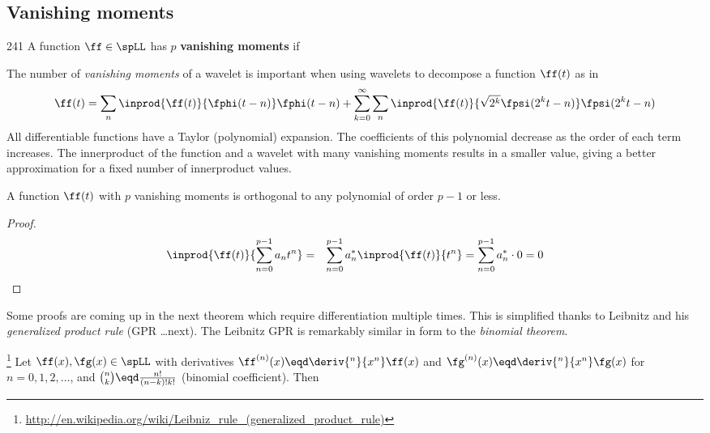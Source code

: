 \subsection{Vanishing moments}
\label{sec:vanish}
\begin{definition}
\citep{mallat}{241}
\label{def:vanish}
A function $\ff\in\spLL$ has $p$ {\bf vanishing moments} if
\end{definition}

The number of {\em vanishing moments} of a wavelet is important
when using wavelets to decompose a function $\ff(t)$ as in
\[ \ff(t) =
   \sum_n \inprod{\ff(t)}{\fphi(t-n)}\fphi(t-n) +
   \sum_{k=0}^\infty \sum_n
   \inprod{\ff(t)}{\sqrt{2^k} \fpsi(2^kt-n)}\fpsi(2^kt-n)
\]
All differentiable functions have a Taylor (polynomial) expansion.
The coefficients of this polynomial decrease as the order of each term increases.
The innerproduct of the function and a wavelet with many vanishing moments
results in a smaller value, giving a better approximation for a fixed
number of innerproduct values.

\begin{proposition}
A function $\ff(t)$ with $p$ vanishing moments is orthogonal to
any polynomial of order $p-1$ or less.
\end{proposition}
\begin{proof}
\begin{eqnarray*}
  \inprod{\ff(t)}{\sum_{n=0}^{p-1}a_n t^n}
    &=& \sum_{n=0}^{p-1}a_n^\ast \inprod{\ff(t)}{t^n}
     =  \sum_{n=0}^{p-1}a_n^\ast \cdot 0
     =  0
\end{eqnarray*}
\end{proof}

Some proofs are coming up in the next theorem
which require differentiation multiple times.
This is simplified thanks to Leibnitz and his {\em generalized
product rule} (GPR \ldots next).
The Leibnitz GPR is remarkably similar in form to the {\em binomial theorem}.
\begin{lemma}
\footnote{\url{http://en.wikipedia.org/wiki/Leibniz_rule_(generalized_product_rule)}}
\label{lem:LGPR}
Let $\ff(x),\fg(x)\in\spLL$ with derivatives
$\ff^{(n)}(x)\eqd\deriv{^n}{x^n}\ff(x)$ and
$\fg^{(n)}(x)\eqd\deriv{^n}{x^n}\fg(x)$ for $n=0,1,2,\ldots$,
and ${n\choose k}\eqd\frac{n!}{(n-k)!k!}$ (binomial coefficient).
Then
\end{lemma}

